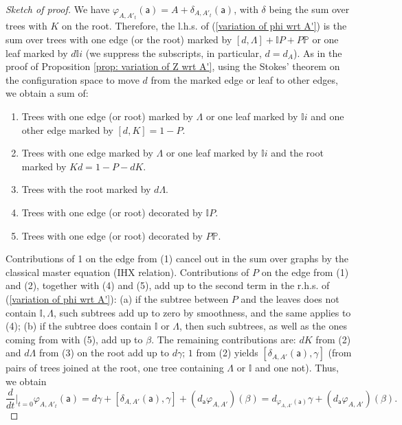 \documentclass[11pt,a4paper]{amsart}
\theoremstyle{plain} %
\theoremstyle{definition}
\theoremstyle{remark}
\newcommand{\sfa}{\mathsf{a}}
\begin{document}
{\begin{proof}[Sketch of proof]
We have $\varphi_{A,A'_t}(\sfa)=A+\delta_{A,A'_t}(\sfa)$, with $\delta$ being the sum over trees with $K$ on the root. Therefore, the l.h.s. of (\ref{variation of phi wrt A'}) is the sum over trees with one edge (or the root) marked by $[d,\Lambda] +\mathbb{I}P+P\mathbb{P}$  
or one leaf marked by $d\mathbb{I}i$ (we suppress the subscripts, in particular, $d=d_A$). As in the proof of Proposition \ref{prop: variation of Z wrt A'}, using the Stokes' theorem on the configuration space to move $d$ from the marked edge or leaf to other edges, we obtain a sum of:
\begin{enumerate}
    \item Trees with one edge (or root) marked by $\Lambda$ or one leaf marked by $\mathbb{I}i$ and one other edge marked by $[d,K]=1-P$.
    \item Trees with one edge marked by $\Lambda$ or one leaf marked by $\mathbb{I}i$ and the root marked by $Kd=1-P-dK$.
    \item Trees with the root marked by $d\Lambda$.
    \item Trees with one edge (or root) decorated by $\mathbb{I}P$.
    \item Trees with one edge (or root) decorated by $P\mathbb{P}$.
\end{enumerate}
Contributions of 1 on the edge from (1) cancel out in the sum over graphs by the classical master equation (IHX relation). Contributions of $P$ on the edge from (1) and (2), together with (4) and (5), add up to the second term in the r.h.s. of (\ref{variation of phi wrt A'}): (a) if the subtree between $P$ and the leaves does not contain $\mathbb{I},\Lambda$, such subtrees add up to zero by smoothness, and the same applies to (4); (b) if the subtree does contain $\mathbb{I}$ or $\Lambda$, then such subtrees, as well as the ones coming from with (5), add up to $\beta$. The remaining contributions are: $dK$ from (2) and $d\Lambda$ from (3) on the root add up to $d\gamma$; $1$ from (2) yields $[\delta_{A,A'}(\sfa),\gamma]$  (from pairs of trees joined at the root, one tree containing $\Lambda$ or $\mathbb{I}$ and one not). Thus, we obtain
\begin{equation}
    \frac{d}{dt}\Big|_{t=0}\varphi_{A,A'_t}(\sfa)=d\gamma+[\delta_{A,A'}(\sfa),\gamma]+(d_\sfa \varphi_{A,A'})(\beta)= d_{\varphi_{A,A'}(\sfa)}\gamma+(d_\sfa \varphi_{A,A'})(\beta).
\end{equation}
\end{proof}

}
\end{document}
